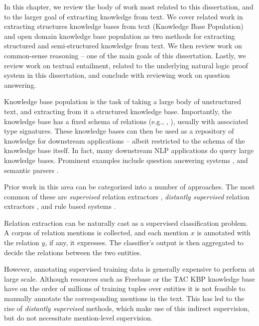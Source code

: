 In this chapter, we review the body of work most related to this dissertation, and to
  the larger goal of extracting knowledge from text.
We cover related work in extracting structures knowledge bases from text
  (Knowledge Base Population) and open domain knowledge base population
  as two methods for extracting structured and semi-structured knowledge from
  text.
We then review work on common-sense reasoning -- one of the main goals of this dissertation.
Lastly, we review work on textual entailment, related to the underlying natural logic
  proof system in this dissertation, and conclude with reviewing work on question answering.


%
%

Knowledge base population is the task of taking a large body of unstructured text,
  and extracting from it a structured knowledge base.
Importantly, the knowledge base has a fixed schema of relations (e.g.,
  , ), usually with associated type signatures.
These knowledge bases can then be used as a repository of knowledge for
  downstream applications -- albeit restricted to the schema of the knowledge base itself.
In fact, many downstream NLP applications do query large knowledge bases.
Prominent examples include
  question answering systems
    \cite{key:2001voorhees-trec},
  and semantic parsers
    \cite{key:1996zelle-semantics,key:2007zettlemoyer-semantics,key:2013kwiatkowski-semantics,key:2014berant-semantics}.

Prior work in this area can be categorized into a number of approaches.
The most common of these are \textit{supervised} relation extractors
  \cite{key:2004doddington-ace,key:2005zhou-ace,key:2007surdeanu-ace},
  \textit{distantly supervised} relation extractors
  \cite{key:1999craven-distsup,key:2007wu-distsup,key:2009mintz-distsup,key:2011sun-kbp},
  and rule based systems
  \cite{key:1997soderland-kbp,key:2010grishman-kbp,key:2010chen-kbp}.


Relation extraction can be naturally cast as a supervised classification problem.
A corpus of relation mentions is collected,
  and each mention $x$ is annotated
  with the relation $y$, if any, it expresses. The classifier's output
  is then aggregated to decide the relations between the two entities.

However, annotating supervised training data is generally
  expensive to perform at large scale.
Although resources such as Freebase or the TAC KBP knowledge base
  have on the order of millions of training tuples over
  entities it is not feasible to manually annotate the 
  corresponding mentions in the text.
This has led to the rise of \textit{distantly supervised} methods, which
  make use of this indirect supervision, but do not
  necessitate mention-level supervision.


